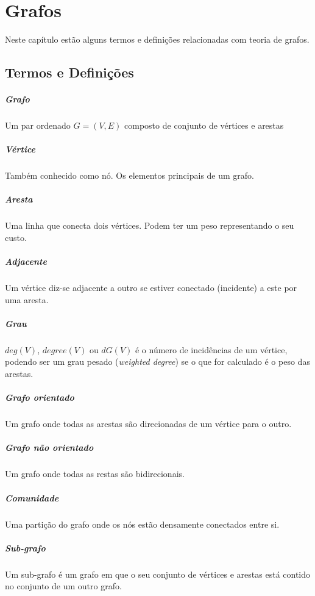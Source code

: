 \chapter{Grafos}
Neste capítulo estão alguns termos e definições relacionadas com teoria de grafos.
\section{Termos e Definições}
\paragraph{Grafo}
Um par ordenado $G = (V,E)$ composto de conjunto de vértices e arestas
\paragraph{Vértice}
Também conhecido como nó. Os elementos principais de um grafo.
\paragraph{Aresta}
Uma linha que conecta dois vértices. Podem ter um peso representando o seu custo.
\paragraph{Adjacente}
Um vértice diz-se adjacente a outro se estiver conectado (incidente) a este por uma aresta.
\paragraph{Grau}
$deg(V)$, $degree(V)$ ou $dG(V)$ é o número de incidências de um vértice, podendo ser um grau pesado (\textit{weighted degree}) se o que for calculado é o peso das arestas.
\paragraph{Grafo orientado}
Um grafo onde todas as arestas são direcionadas de um vértice para o outro.
\paragraph{Grafo não orientado}
Um grafo onde todas as restas são bidirecionais.
\paragraph{Comunidade}
Uma partição do grafo onde os nós estão densamente conectados entre si.
\paragraph{Sub-grafo}
Um sub-grafo é um grafo em que o seu conjunto de vértices e arestas está contido no conjunto de um outro grafo.
